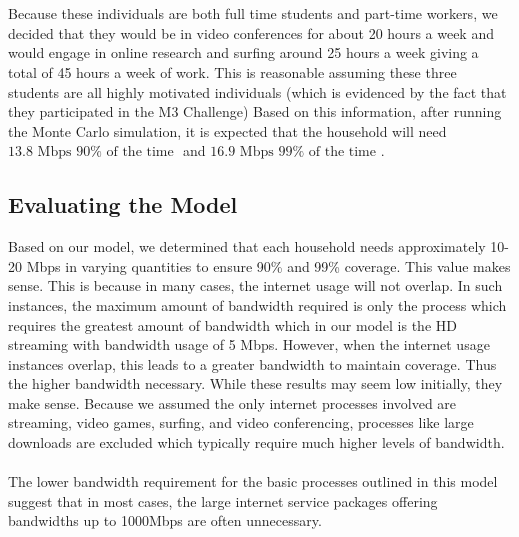 \documentclass[12pt]{article}
\begin{document}
\\
\\
Because these individuals are both full time students and part-time workers, we decided that they would be in video conferences for about 20 hours a week and would engage in online research and surfing around 25 hours a week giving a total of 45 hours a week of work. This is reasonable assuming these three students are all highly motivated individuals (which is evidenced by the fact that they participated in the M3 Challenge) Based on this information, after running the Monte Carlo simulation, it is expected that the household will need $\boxed{13.8 \text{ Mbps } 90\% \text{ of the time }}$ and $\boxed{16.9 \text{ Mbps } 99\% \text{ of the time }}$.

\subsection{Evaluating the Model}
Based on our model, we determined that each household needs approximately 10-20 Mbps in varying quantities to ensure 90\% and 99\% coverage. This value makes sense. This is because in many cases, the internet usage will not overlap. In such instances, the maximum amount of bandwidth required is only the process which requires the greatest amount of bandwidth which in our model is the HD streaming with bandwidth usage of 5 Mbps. However, when the internet usage instances overlap, this leads to a greater bandwidth to maintain coverage. Thus the higher bandwidth necessary. While these results may seem low initially, they make sense. Because we assumed the only internet processes involved are streaming, video games, surfing, and video conferencing, processes like large downloads are excluded which typically require much higher levels of bandwidth.
\\
\\
The lower bandwidth requirement for the basic processes outlined in this model suggest that in most cases, the large internet service packages offering bandwidths up to 1000Mbps are often unnecessary.  
\end{document}
